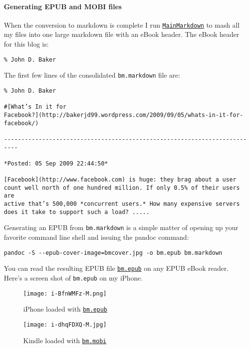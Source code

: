 \paragraph{Generating EPUB and MOBI files}

When the conversion to markdown is complete I run \href{http://www.box.com/s/36mzi78mt8tk6oygy2r8}{\texttt{MainMarkdown}}
to mash all my files into one large markdown file with an eBook header.
The eBook header for this blog is:


\begin{lstlisting}[language=jdoc,frame=single,framerule=0pt,label=lst:scr2587X0]
% Analyze the Data not the Drivel
% John D. Baker
\end{lstlisting}

\noindent The first few lines of the consolidated \texttt{bm.markdown} file are:

\begin{lstlisting}[language=jdoc,frame=single,framerule=0pt,label=lst:scr2587X1]
% Analyze the Data not the Drivel
% John D. Baker

#[What’s In it for
Facebook?](http://bakerjd99.wordpress.com/2009/09/05/whats-in-it-for-facebook/)

--------------------------------------------------------------------------

*Posted: 05 Sep 2009 22:44:50*

[Facebook](http://www.facebook.com) is huge: they brag about a user
count well north of one hundred million. If only 0.5% of their users are
active that’s 500,000 *concurrent users.* How many expensive servers
does it take to support such a load? .....
\end{lstlisting}

\noindent Generating an EPUB from \texttt{bm.markdown} is a simple matter of
opening up your favorite command line shell and issuing the pandoc
command:
\begin{verbatim}
pandoc -S --epub-cover-image=bmcover.jpg -o bm.epub bm.markdown
\end{verbatim}
You can read the resulting EPUB file \href{http://www.box.com/s/ep9cgmdu6r3s322z5xim}{\texttt{bm.epub}} on any EPUB eBook
reader. Here's a screen shot of \texttt{bm.epub} on my iPhone.

\captionsetup[figure]{labelformat=empty}
\begin{figure}[ht]
\begin{minipage}[b]{0.48\textwidth}
\centering
\texttt{[image: i-BfnWMFz-M.png]}
\caption{iPhone loaded with \href{http://www.box.com/s/ep9cgmdu6r3s322z5xim}{\texttt{bm.epub}}}
\label{fig:2587X0}
\end{minipage}
\hspace{1pt}
\begin{minipage}[b]{0.48\textwidth}
\centering
\texttt{[image: i-dhqFDXQ-M.jpg]}
\caption{Kindle loaded with \href{http://www.box.com/s/ttbyijqgmcnjzzsgfs0a}{\texttt{bm.mobi}}}
\label{fig:2587X1}
\end{minipage}
\end{figure}



